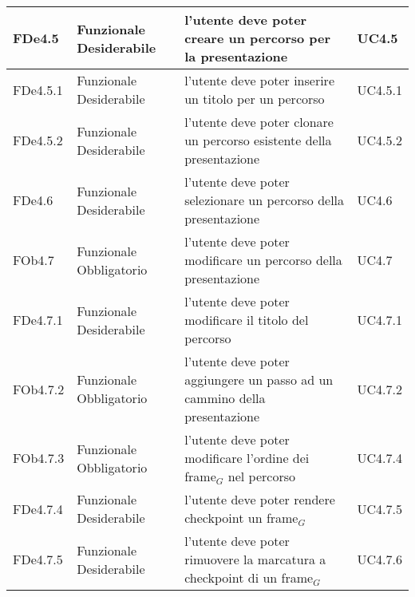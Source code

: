 \begin{longtable}{|l|p{2.5cm}|p{5cm}|p{3.5cm}|}
FDe4.5 & Funzionale \linebreak Desiderabile & l'utente deve poter creare un percorso per la presentazione & UC4.5 \linebreak  \\
\hline
FDe4.5.1 & Funzionale \linebreak Desiderabile & l'utente deve poter inserire un titolo per un percorso & UC4.5.1 \linebreak  \\
\hline
FDe4.5.2 & Funzionale \linebreak Desiderabile & l'utente deve poter clonare un percorso esistente della presentazione & UC4.5.2 \linebreak  \\
\hline
FDe4.6 & Funzionale \linebreak Desiderabile & l'utente deve poter selezionare un percorso della presentazione & UC4.6 \linebreak  \\
\hline
FOb4.7 & Funzionale \linebreak Obbligatorio & l'utente deve poter modificare un percorso della presentazione & UC4.7 \linebreak  \\
\hline
FDe4.7.1 & Funzionale \linebreak Desiderabile & l'utente deve poter modificare il titolo del percorso & UC4.7.1 \linebreak  \\
\hline
FOb4.7.2 & Funzionale \linebreak Obbligatorio & l'utente deve poter aggiungere un passo ad un cammino della presentazione & UC4.7.2 \linebreak  \\
\hline
FOb4.7.3 & Funzionale \linebreak Obbligatorio & l'utente deve poter modificare l'ordine dei frame$_G$ nel percorso & UC4.7.4 \linebreak  \\
\hline
FDe4.7.4 & Funzionale \linebreak Desiderabile & l'utente deve poter rendere checkpoint un frame$_G$ & UC4.7.5 \linebreak  \\
\hline
FDe4.7.5 & Funzionale \linebreak Desiderabile & l'utente deve poter rimuovere la marcatura a checkpoint di un frame$_G$ & UC4.7.6 \linebreak  \\

\end{longtable}

